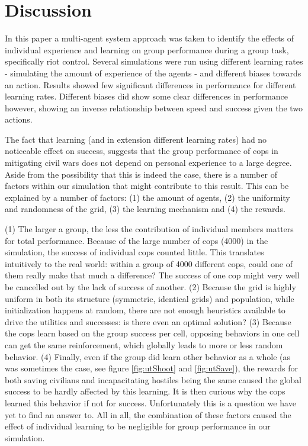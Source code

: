 \section{Discussion}
In this paper a multi-agent system approach was taken to identify the effects of individual experience and learning on group performance during a group task, specifically riot control. Several simulations were run using different learning rates - simulating the amount of experience of the agents - and different biases towards an action. Results showed few significant differences in performance for different learning rates. Different biases did show some clear differences in performance however, showing an inverse relationship between speed and success given the two actions.

The fact that learning (and in extension different learning rates) had no noticeable effect on success, suggests that the group performance of cops in mitigating civil wars does not depend on personal experience to a large degree. Aside from the possibility that this is indeed the case, there is a number of factors within our simulation that might contribute to this result.
This can be explained by a number of factors: (1) the amount of agents, (2) the uniformity and randomness of the grid, (3) the learning mechanism and (4) the rewards. 

(1) The larger a group, the less the contribution of individual members matters for total performance. Because of the large number of cops (4000) in the simulation, the success of individual cops counted little. This translates intuitively to the real world: within a group of 4000 different cops, could one of them really make that much a difference? The success of one cop might very well be cancelled out by the lack of success of another.
(2) Because the grid is highly uniform in both its structure (symmetric, identical grids) and population, while initialization happens at random, there are not enough heuristics available to drive the utilities and successes: is there even an optimal solution? (3) Because the cops learn based on the group success per cell, opposing behaviors in one cell can get the same reinforcement, which globally leads to more or less random behavior. (4) Finally, even if the group did learn other behavior as a whole (as was sometimes the case, see figure \ref{fig:utShoot} and \ref{fig:utSave}), the rewards for both saving civilians and incapacitating hostiles being the same caused the global success to be hardly affected by this learning. It is then curious why the cops learned this behavior if not for success. Unfortunately this is a question we have yet to find an answer to.
All in all, the combination of these factors caused the effect of individual learning to be negligible for group performance in our simulation.

